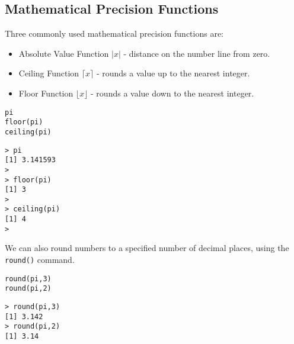 \subsection{Mathematical Precision Functions}
Three commonly used mathematical precision functions are:
\begin{itemize}
\item Absolute Value Function $| x |$ - distance on the number line from zero.
\item Ceiling Function $\lceil x \rceil$ - rounds a value up to the nearest integer.
\item Floor Function  $\lfloor x \rfloor $ - rounds a value down to the nearest integer.
\end{itemize}
\begin{framed}
\begin{verbatim}
pi
floor(pi)
ceiling(pi)
\end{verbatim}
\end{framed}
\begin{verbatim}
> pi
[1] 3.141593
>
> floor(pi)
[1] 3
>
> ceiling(pi)
[1] 4
>
\end{verbatim}
We can also round numbers to a specified number of decimal places, using the \texttt{round()} command.
\begin{framed}
\begin{verbatim}
round(pi,3)
round(pi,2)
\end{verbatim}
\end{framed}
\begin{verbatim}
> round(pi,3)
[1] 3.142
> round(pi,2)
[1] 3.14
\end{verbatim}


